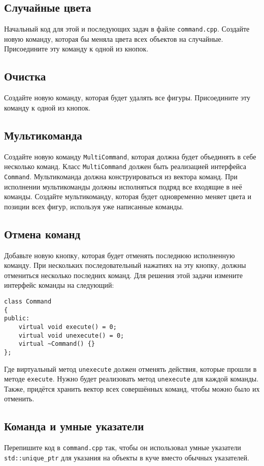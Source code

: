 \documentclass{article}
\begin{document}
\subsection{Случайные цвета}
Начальный код для этой и последующих задач в файле \texttt{command.cpp}. Создайте новую команду, которая бы меняла цвета всех объектов на случайные. Присоедините эту команду к одной из кнопок.

\subsection{Очистка}
Создайте новую команду, которая будет удалять все фигуры. Присоедините эту команду к одной из кнопок.
        
\subsection{Мультикоманда}
Создайте новую команду \texttt{MultiCommand}, которая должна будет объединять в себе несколько команд. Класс \texttt{MultiCommand} должен быть реализацией интерфейса \texttt{Command}. Мультикоманда должна конструироваться из вектора команд. При исполнении мультикоманды должны исполняться подряд все входящие в неё команды. Создайте мультикоманду, которая будет одновременно меняет цвета и позиции всех фигур, используя уже написанные команды.


\subsection{Отмена команд}
Добавьте новую кнопку, которая будет отменять последнюю исполненную команду.
При нескольких последовательный нажатиях на эту кнопку, должны отмениться несколько последних команд.
Для решения этой задачи измените интерфейс команды на следующий:
\begin{lstlisting}
class Command
{
public:
    virtual void execute() = 0;
    virtual void unexecute() = 0;
    virtual ~Command() {}
};
\end{lstlisting}
Где виртуальный метод \texttt{unexecute} должен отменять действия, которые прошли в методе \texttt{execute}. Нужно будет реализовать метод \texttt{unexecute} для каждой команды. Также, придётся хранить вектор всех совершённых команд, чтобы можно было их отменить.


\subsection{Команда и умные указатели}
Перепишите код в \texttt{command.cpp} так, чтобы он использовал умные указатели \texttt{std::unique\_ptr} для указания на объекты в куче вместо обычных указателей.
\end{document}
